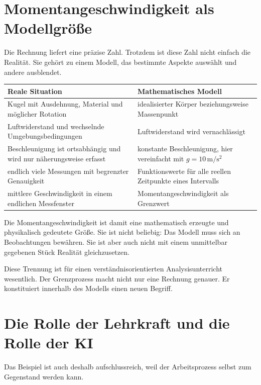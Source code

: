 \documentclass[11pt,a4paper]{article}
\begin{document}
\section{Momentangeschwindigkeit als Modellgröße}

Die Rechnung liefert eine präzise Zahl. Trotzdem ist diese Zahl nicht einfach
\glqq die Realität\grqq. Sie gehört zu einem Modell, das bestimmte Aspekte
auswählt und andere ausblendet.

\begin{center}
\begin{tabularx}{\textwidth}{@{}>{\raggedright\arraybackslash}X
                                  >{\raggedright\arraybackslash}X@{}}
\toprule
\textbf{Reale Situation} & \textbf{Mathematisches Modell} \\
\midrule
Kugel mit Ausdehnung, Material und möglicher Rotation
  & idealisierter Körper beziehungsweise Massenpunkt \\
Luftwiderstand und wechselnde Umgebungsbedingungen
  & Luftwiderstand wird vernachlässigt \\
Beschleunigung ist ortsabhängig und wird nur näherungsweise erfasst
  & konstante Beschleunigung, hier vereinfacht mit $g=10\,\mathrm{m/s^2}$ \\
endlich viele Messungen mit begrenzter Genauigkeit
  & Funktionswerte für alle reellen Zeitpunkte eines Intervalls \\
mittlere Geschwindigkeit in einem endlichen Messfenster
  & Momentangeschwindigkeit als Grenzwert \\
\bottomrule
\end{tabularx}
\end{center}

Die Momentangeschwindigkeit ist damit eine mathematisch erzeugte und physikalisch
gedeutete Größe. Sie ist nicht beliebig: Das Modell muss sich an Beobachtungen
bewähren. Sie ist aber auch nicht mit einem unmittelbar gegebenen Stück Realität
gleichzusetzen.

Diese Trennung ist für einen verständnisorientierten Analysisunterricht
wesentlich. Der Grenzprozess macht nicht nur eine Rechnung genauer. Er
konstituiert innerhalb des Modells einen neuen Begriff.


\section{Die Rolle der Lehrkraft und die Rolle der KI}

Das Beispiel ist auch deshalb aufschlussreich, weil der Arbeitsprozess selbst
zum Gegenstand werden kann.
\end{document}
